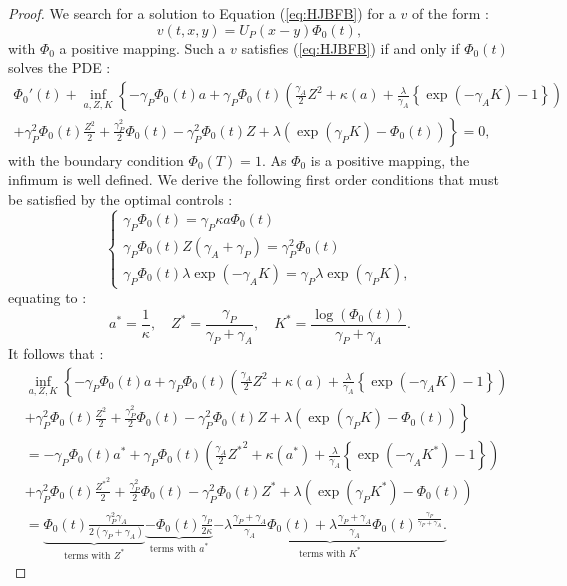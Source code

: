 \documentclass[numbook, envcountsect, envcountsame, envcountreset, runningheads, smallextended]{article}
\begin{document}
\begin{proof}
We search for a solution to Equation (\ref{eq:HJBFB})  for a $v$ of the form : $$v(t,x,y)=U_P(x-y) \Phi_0(t),$$ with $\Phi_0$ a positive mapping. Such a $v$ satisfies  (\ref{eq:HJBFB})  if and only if  $\Phi_0(t)$ solves the PDE : 
\begin{align*}
 \Phi_0'(t) + \inf_{a,Z,K}\left\{ -\gamma_P \Phi_0(t)a + \gamma_P \Phi_0(t) \left( \frac{\gamma_A}{2}Z^2 + \kappa(a) + \frac{\lambda}{\gamma_A} \left\{\exp(-\gamma_A K) -1 \right\} \right) \right. \\
 \left. + \gamma_P^2 \Phi_0(t) \frac{Z^2}{2} + \frac{\gamma_P^2}{2} \Phi_0(t) - \gamma_P^2 \Phi_0(t) Z + \lambda \left( \exp(\gamma_P K) - \Phi_0(t) \right)\right\}=0,
 \end{align*}
with the boundary condition $\Phi_0(T)=1.$  As $\Phi_0$ is a positive mapping, the infimum is well defined. We derive the following first order conditions that must be satisfied by the optimal controls : 
$$ \begin{cases}
\gamma_P \Phi_0(t) = \gamma_P \kappa a \Phi_0(t)\\
\gamma_P \Phi_0(t) Z (\gamma_A  + \gamma_P) = \gamma_P^2 \Phi_0(t)\\
\gamma_P \Phi_0(t) \lambda \exp(-\gamma_A K) = \gamma_P \lambda \exp(\gamma_P K),
\end{cases}$$
equating to : 
$$ a^* = \frac{1}{\kappa}, \quad Z^* = \frac{\gamma_P}{\gamma_P + \gamma_A}, \quad K^* = \frac{\log(\Phi_0(t))}{\gamma_P + \gamma_A}.$$
It follows that : 
\begin{align*}
&\inf_{a,Z,K}\left\{ -\gamma_P \Phi_0(t)a + \gamma_P \Phi_0(t) \left( \frac{\gamma_A}{2}Z^2 + \kappa(a) + \frac{\lambda}{\gamma_A} \left\{\exp(-\gamma_A K) -1 \right\} \right) \right. \\
 &\left. + \gamma_P^2 \Phi_0(t) \frac{Z^2}{2} + \frac{\gamma_P^2}{2} \Phi_0(t) - \gamma_P^2 \Phi_0(t) Z + \lambda \left( \exp(\gamma_P K) - \Phi_0(t) \right)\right\}\\
 &=   -\gamma_P \Phi_0(t)a^* + \gamma_P \Phi_0(t) \left( \frac{\gamma_A}{2}{Z^*}^2 + \kappa(a^*) + \frac{\lambda}{\gamma_A} \left\{\exp(-\gamma_A K^*) -1 \right\} \right)  \\
 &+ \gamma_P^2 \Phi_0(t) \frac{{Z^*}^2}{2} + \frac{\gamma_P^2}{2} \Phi_0(t) - \gamma_P^2 \Phi_0(t) Z^* + \lambda \left( \exp(\gamma_P K^*) - \Phi_0(t) \right) \\
 &=  \underbrace{\Phi_0(t) \frac{\gamma_P^2\gamma_A}{2(\gamma_P+\gamma_A)}}_{\text{terms with } Z^*}  \underbrace{- \Phi_0(t) \frac{\gamma_P}{2\kappa}}_{ \text{terms with }a^* }  \underbrace{- \lambda  \frac{\gamma_P + \gamma_A}{\gamma_A} \Phi_0(t) + \lambda \frac{\gamma_P + \gamma_A}{\gamma_A} \Phi_0(t)^{\frac{\gamma_P}{\gamma_P+\gamma_A}}.}_{ \text{terms with }K^*}
 \end{align*}


\end{proof}
\end{document}
